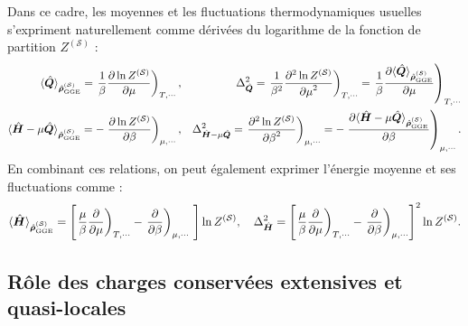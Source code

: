 Dans ce cadre, les moyennes et les fluctuations thermodynamiques usuelles s’expriment naturellement comme dérivées du logarithme de la fonction de partition $Z^{(\mathcal{S})}$ :
\begin{eqnarray}
	\langle \hat{\bm{Q}} \rangle_{\hat{\bm{\rho}}^{(\mathcal{S})}_{\mathrm{GGE}}}  = \left .\frac{1}{\beta} \frac{ \partial \ln Z^{(\mathcal{S})}}{\partial \mu } \right )_{T,\cdots},  & & \Delta^2_{\hat{\bm{Q}}} = \left . \frac{1}{\beta^2} \frac{ \partial^2 \ln Z^{(\mathcal{S})}}{{\partial \mu}^2 } \right )_{T,\cdots} =  \left . \frac{1}{\beta} \frac{ \partial \langle \hat{\bm{Q}} \rangle_{\hat{\bm{\rho}}^{(\mathcal{S})}_{\mathrm{GGE}}}}{\partial \mu } \right )_{T,\cdots}\\
	\langle \hat{\bm{H}} - \mu\hat{\bm{Q}}  \rangle_{\hat{\bm{\rho}}^{(\mathcal{S})}_{\mathrm{GGE}}}  = -\left . \frac{ \partial \ln Z^{(\mathcal{S})}}{\partial \beta } \right )_{\mu , \cdots} ,  & & \Delta^2_{\hat{\bm{H}} - \mu\hat{\bm{Q}}} = \left .  \frac{ \partial^2 \ln Z^{(\mathcal{S})}}{{\partial \beta}^2 } \right )_{\mu , \cdots} =  -\left .  \frac{ \partial \langle \hat{\bm{H}} - \mu\hat{\bm{Q}} \rangle_{\hat{\bm{\rho}}^{(\mathcal{S})}_{\mathrm{GGE}}}}{\partial \beta } \right )_{\mu , \cdots}.		
\end{eqnarray}
En combinant ces relations, on peut également exprimer l’énergie moyenne et ses fluctuations comme :
\begin{eqnarray}
	\langle \operator{H} \rangle_{\operator{\rho}^{(\mathcal{S})}_{\mathrm{GGE}}}  = \left [ \left .\frac{\mu}{\beta} \frac{ \partial}{\partial \mu } \right )_{T,\cdots} -\left . \frac{ \partial }{\partial \beta } \right )_{\mu, \cdots}   \right ]\ln Z^{(\mathcal{S})},  \quad  \Delta^2_{\operator{H} } = \left [ \left .\frac{\mu}{\beta} \frac{ \partial}{\partial \mu } \right )_{T,\cdots} -\left . \frac{ \partial }{\partial \beta } \right )_{\mu,\cdots}  \right ]^2\ln Z^{(\mathcal{S})}.		
\end{eqnarray}






%
\subsection{Rôle des charges conservées extensives et quasi-locales}


